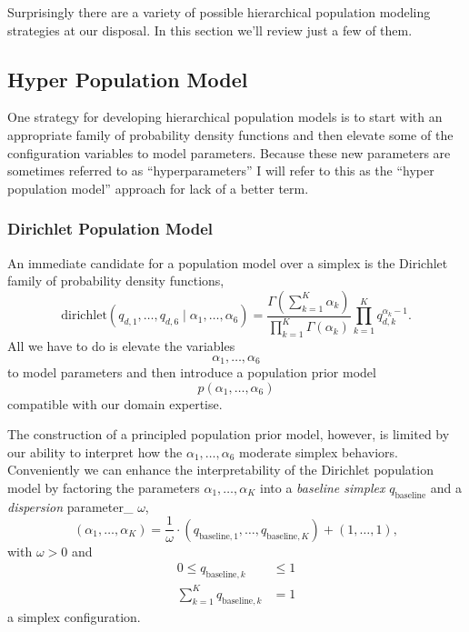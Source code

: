 \documentclass[
  letterpaper,
  DIV=11,
  numbers=noendperiod]{scrartcl}
\begin{document}
Surprisingly there are a variety of possible hierarchical population
modeling strategies at our disposal. In this section we'll review just a
few of them.

\subsection{Hyper Population Model}\label{sec:hyperpop}

One strategy for developing hierarchical population models is to start
with an appropriate family of probability density functions and then
elevate some of the configuration variables to model parameters. Because
these new parameters are sometimes referred to as ``hyperparameters'' I
will refer to this as the ``hyper population model'' approach for lack
of a better term.

\subsubsection{Dirichlet Population
Model}\label{dirichlet-population-model}

An immediate candidate for a population model over a simplex is the
Dirichlet family of probability density functions, \[
\mathrm{dirichlet}( q_{d, 1}, \ldots, q_{d, 6} \mid
                    \alpha_{1}, \ldots, \alpha_{6} )
=
\frac{ \Gamma \left( \sum_{k = 1}^{K} \alpha_{k} \right) }
{ \prod_{k = 1}^{K} \Gamma \left( \alpha_{k} \right) }
\prod_{k = 1}^{K} q_{d, k}^{\alpha_{k} - 1}.
\] All we have to do is elevate the variables \[
\alpha_{1}, \ldots, \alpha_{6}
\] to model parameters and then introduce a population prior model \[
p ( \alpha_{1}, \ldots, \alpha_{6} )
\] compatible with our domain expertise.

The construction of a principled population prior model, however, is
limited by our ability to interpret how the
\(\alpha_{1}, \ldots, \alpha_{6}\) moderate simplex behaviors.
Conveniently we can enhance the interpretability of the Dirichlet
population model by factoring the parameters
\(\alpha_{1}, \ldots, \alpha_{K}\) into a \emph{baseline simplex}
\(q_{\mathrm{baseline}}\) and a \emph{dispersion} parameter\_
\(\omega\), \[
( \alpha_{1}, \ldots, \alpha_{K} )
=
\frac{1}{\omega} \cdot
( q_{\mathrm{baseline}, 1}, \ldots, q_{\mathrm{baseline}, K} )
+ (1, \ldots, 1),
\] with \(\omega > 0\) and \begin{align*}
0 \le q_{\mathrm{baseline}, k} &\le 1
\\
\sum_{k = 1}^{K} q_{\mathrm{baseline}, k} &= 1
\end{align*} a simplex configuration.
\end{document}
